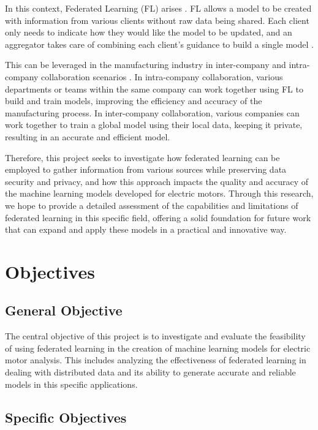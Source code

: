 \documentclass{article}
\begin{document}
In this context, Federated Learning (FL) arises \cite{ZHANG2021survey}. FL allows a model to be created with information from various clients without raw data being shared. Each client only needs to indicate how they would like the model to be updated, and an aggregator takes care of combining each client's guidance to build a single model \cite{ZHANG2021survey,ye2023heterogeneous}.

This can be leveraged in the manufacturing industry in inter-company and intra-company collaboration scenarios \cite{islam2023applications}. In intra-company collaboration, various departments or teams within the same company can work together using FL to build and train models, improving the efficiency and accuracy of the manufacturing process. In inter-company collaboration, various companies can work together to train a global model using their local data, keeping it private, resulting in an accurate and efficient model.

Therefore, this project seeks to investigate how federated learning can be employed to gather information from various sources while preserving data security and privacy, and how this approach impacts the quality and accuracy of the machine learning models developed for electric motors. Through this research, we hope to provide a detailed assessment of the capabilities and limitations of federated learning in this specific field, offering a solid foundation for future work that can expand and apply these models in a practical and innovative way.

\section{Objectives}

\subsection{General Objective}

The central objective of this project is to investigate and evaluate the feasibility of using federated learning in the creation of machine learning models for electric motor analysis. This includes analyzing the effectiveness of federated learning in dealing with distributed data and its ability to generate accurate and reliable models in this specific applications.

\subsection{Specific Objectives}
\end{document}
